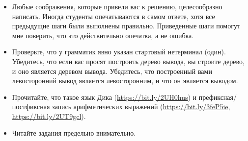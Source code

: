 \documentclass[12pt]{article}
\begin{document}
\begin{itemize}
  \item Любые соображения, которые привели вас к решению, целесообразно написать. Иногда студенты опечатываются в самом ответе, хотя все предыдущие шаги были выполнены правильно. Приведенные шаги помогут мне поверить, что это действительно опечатка, а не ошибка.
  \item Проверьте, что у грамматик явно указан стартовый нетерминал (один). Убедитесь, что если вас просят построить дерево вывода, вы строите дерево, и оно является деревом вывода. Убедитесь, что построенный вами левосторонний вывод является левосторонним, и что он является выводом.
  \item Прочитайте, что такое язык Дика (\url{https://bit.ly/2UH0hus}) и префиксная/постфиксная запись арифметических выражений (\url{https://bit.ly/3feP5ie}, \url{https://bit.ly/2UT9gcl}).
  \item Читайте задания предельно внимательно.
\end{itemize}
\end{document}
